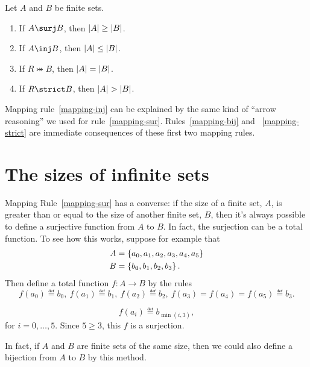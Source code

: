 \begin{lemma}\label{mapruldef}
 \mbox{}
Let $A$ and $B$ be finite sets.

\begin{enumerate}

\item\label{mapping-sur} If $A \surj B$, then $\left|A\right| \geq \left|B\right|$.

\item\label{mapping-inj} If $A \inj B$, then $\left|A\right| \leq \left|B\right|$.

\item\label{mapping-bij} If $R \bij B$, then $\left|A\right| = \left|B\right|$.

\item\label{mapping-strict} If $R \strict B$, then $\left|A\right| > \left|B\right|$.

\end{enumerate}

\end{lemma}

Mapping rule~\ref{mapping-inj} can be explained by the same kind of
``arrow reasoning'' we used for rule~\ref{mapping-sur}.
Rules~\ref{mapping-bij} and ~\ref{mapping-strict} are immediate
consequences of these first two mapping rules.

\section{The sizes of infinite sets}

Mapping Rule~\ref{mapping-sur} has a converse:
if the size of a finite set, $A$, is greater than or equal to the size of
another finite set, $B$, then it's always possible to define a
surjective function from $A$ to $B$.  In fact, the surjection can be a
total function.  To see how this works, suppose for example that
\begin{align*}
A & =\left\{a_0,a_1,a_2,a_3,a_4,a_5\right\}\\
B & =\left\{b_0,b_1,b_2,b_3\right\}.
\end{align*}
Then define a total function $f:A\to B$ by the rules
\[
f(a_0) \eqdef b_0,\  f(a_1) \eqdef b_1,\  f(a_2) \eqdef b_2,\  f(a_3)=
f(a_4)=f(a_5) \eqdef b_3.
\]

\begin{staffnotes}

\[
f(a_i) \eqdef b_{\min(i,3)},
\]
for $i=0, \dots, 5$.  Since $5 \geq 3$, this $f$ is a surjection.

\end{staffnotes}
In fact, if $A$ and $B$ are finite sets of the same size, then we could also
define a bijection from $A$ to $B$ by this method.

